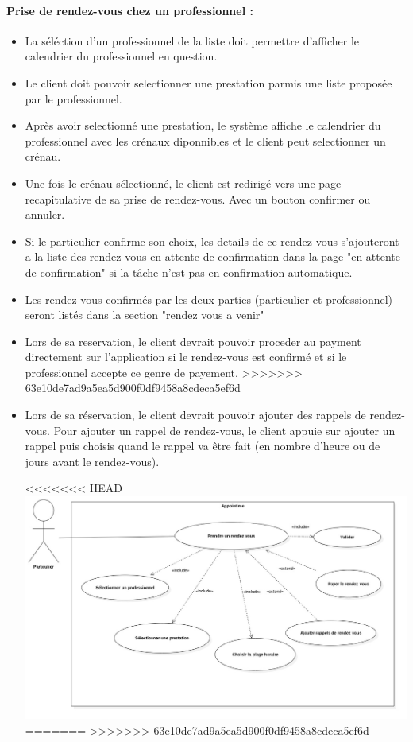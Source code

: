 \documentclass{article}
\begin{document}
\begin{itemize}
\begin{itemize}
\end{itemize}

\paragraph{Prise de rendez-vous chez un professionnel :}
\begin{itemize}

\item La séléction d'un
  professionnel de la liste doit permettre d'afficher le
  calendrier du professionnel en question.
\item Le client doit pouvoir selectionner une prestation parmis une liste
  proposée par le professionnel.
\item Après avoir selectionné une prestation, le système affiche le
  calendrier du professionnel avec les crénaux diponnibles et le
  client peut selectionner un crénau.
\item Une fois le crénau sélectionné, le client est redirigé vers
    une page recapitulative de sa prise de rendez-vous. Avec un bouton
    confirmer ou annuler.
\item Si le particulier confirme son choix, les details de ce rendez vous s'ajouteront a la liste des rendez 
vous en attente de confirmation dans la page "en attente de confirmation"
si la tâche n'est pas en confirmation automatique.
\item Les rendez vous confirmés par les deux parties (particulier et professionnel) seront listés dans la section "rendez vous a venir"
\item Lors de sa reservation, le client devrait pouvoir proceder au
  payment directement sur l'application si le rendez-vous est confirmé et si le professionnel accepte ce genre de payement.
>>>>>>> 63e10de7ad9a5ea5d900f0df9458a8cdeca5ef6d
\item Lors de sa réservation, le client devrait pouvoir ajouter des
  rappels de rendez-vous. Pour ajouter un rappel de rendez-vous, le
  client appuie sur \og ajouter un rappel \fg{} puis choisis quand le
  rappel va être fait (en nombre d'heure ou de jours avant le
  rendez-vous).

<<<<<<< HEAD
\includegraphics[scale=0.3]{ShematDiagrammes/useCasePriseRdv.jpg}
=======
>>>>>>> 63e10de7ad9a5ea5d900f0df9458a8cdeca5ef6d



\end{itemize}
\end{itemize}
\end{document}
